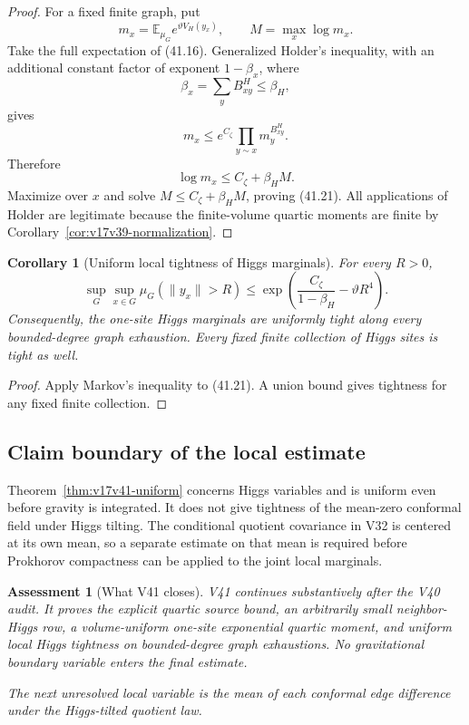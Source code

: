 \documentclass[11pt]{article}
\newtheorem{corollary}[theorem]{Corollary}
\newtheorem{assessment}[theorem]{Assessment}
\theoremstyle{remark}
\begin{document}
\begin{proof}
For a fixed finite graph, put
\[
 m_x=\mathbb E_{\mu_G}e^{\vartheta V_H(y_x)},
 \qquad M=\max_x\log m_x.                          \tag{41.22}
\]
Take the full expectation of (41.16).  Generalized Holder's inequality,
with an additional constant factor of exponent \(1-\beta_x\), where
\[
 \beta_x=\sum_yB_{xy}^{H}\leq\beta_H,             \tag{41.23}
\]
gives
\[
 m_x
 \leq e^{C_\zeta}
 \prod_{y\sim x}m_y^{B_{xy}^{H}}.                 \tag{41.24}
\]
Therefore
\[
 \log m_x\leq C_\zeta+\beta_HM.                  \tag{41.25}
\]
Maximize over \(x\) and solve
\(M\leq C_\zeta+\beta_HM\), proving (41.21).
All applications of Holder are legitimate because the finite-volume
quartic moments are finite by Corollary~\ref{cor:v17v39-normalization}.
\end{proof}

\begin{corollary}[Uniform local tightness of Higgs marginals]
\label{cor:v17v41-tight}
For every \(R>0\),
\[
 \sup_G\sup_{x\in G}
 \mu_G(\|y_x\|>R)
 \leq\exp\left(
 \frac{C_\zeta}{1-\beta_H}-\vartheta R^4
 \right).                                         \tag{41.26}
\]
Consequently, the one-site Higgs marginals are uniformly tight along
every bounded-degree graph exhaustion.  Every fixed finite collection
of Higgs sites is tight as well.
\end{corollary}

\begin{proof}
Apply Markov's inequality to (41.21).  A union bound gives tightness for
any fixed finite collection.
\end{proof}

\subsection{Claim boundary of the local estimate}

Theorem~\ref{thm:v17v41-uniform} concerns Higgs variables and is uniform
even before gravity is integrated.  It does not give tightness of the
mean-zero conformal field under Higgs tilting.  The conditional quotient
covariance in V32 is centered at its own mean, so a separate estimate
on that mean is required before Prokhorov compactness can be applied to
the joint local marginals.

\begin{assessment}[What V41 closes]
\label{ass:v17v41-status}
V41 continues substantively after the V40 audit.  It proves the explicit
quartic source bound, an arbitrarily small neighbor-Higgs row, a
volume-uniform one-site exponential quartic moment, and uniform local
Higgs tightness on bounded-degree graph exhaustions.  No gravitational
boundary variable enters the final estimate.

The next unresolved local variable is the mean of each conformal edge
difference under the Higgs-tilted quotient law.
\end{assessment}
\end{document}

